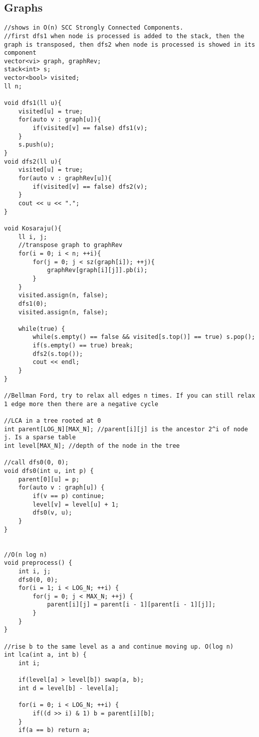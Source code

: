 \documentclass[a4paper]{article}
\begin{document}
\subsection*{Graphs}
\begin{verbatim}
//shows in O(n) SCC Strongly Connected Components.
//first dfs1 when node is processed is added to the stack, then the graph is transposed, then dfs2 when node is processed is showed in its component
vector<vi> graph, graphRev;
stack<int> s;
vector<bool> visited;
ll n;

void dfs1(ll u){
    visited[u] = true;
    for(auto v : graph[u]){
        if(visited[v] == false) dfs1(v);
    }
    s.push(u);
}
void dfs2(ll u){
    visited[u] = true;
    for(auto v : graphRev[u]){
        if(visited[v] == false) dfs2(v);
    }
    cout << u << ".";
}

void Kosaraju(){
    ll i, j;
    //transpose graph to graphRev
    for(i = 0; i < n; ++i){
        for(j = 0; j < sz(graph[i]); ++j){
            graphRev[graph[i][j]].pb(i);
        }
    }
    visited.assign(n, false);
    dfs1(0);
    visited.assign(n, false);
    
    while(true) {
        while(s.empty() == false && visited[s.top()] == true) s.pop();
        if(s.empty() == true) break;
        dfs2(s.top());
        cout << endl;
    }
}

//Bellman Ford, try to relax all edges n times. If you can still relax 1 edge more then there are a negative cycle

//LCA in a tree rooted at 0
int parent[LOG_N][MAX_N]; //parent[i][j] is the ancestor 2^i of node j. Is a sparse table
int level[MAX_N]; //depth of the node in the tree

//call dfs0(0, 0);
void dfs0(int u, int p) {
    parent[0][u] = p;
    for(auto v : graph[u]) {
        if(v == p) continue;
        level[v] = level[u] + 1;
        dfs0(v, u);
    }
}


//O(n log n)
void preprocess() {
    int i, j;
    dfs0(0, 0);
    for(i = 1; i < LOG_N; ++i) {
        for(j = 0; j < MAX_N; ++j) {
            parent[i][j] = parent[i - 1][parent[i - 1][j]];
        }
    }
}

//rise b to the same level as a and continue moving up. O(log n)
int lca(int a, int b) {
    int i;

    if(level[a] > level[b]) swap(a, b);
    int d = level[b] - level[a];
    
    for(i = 0; i < LOG_N; ++i) {
        if((d >> i) & 1) b = parent[i][b];
    }
    if(a == b) return a;
    

\end{verbatim}
\end{document}
